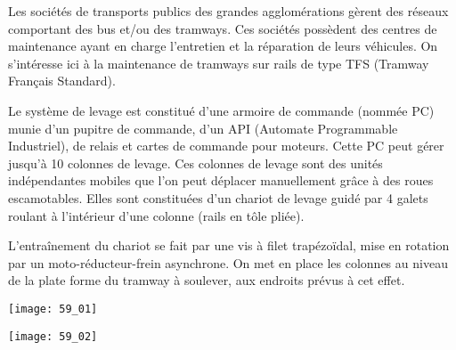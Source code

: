 \normaltrue \difficilefalse \tdifficilefalse
\correctionfalse

\setcounter{question}{0}

\ifcorrection
\else
{}
\fi

\ifprof
\else

Les sociétés de transports publics des grandes agglomérations gèrent des réseaux comportant des
bus et/ou des tramways. Ces sociétés possèdent des centres de maintenance ayant en charge
l’entretien et la réparation de leurs véhicules. %
On s'intéresse ici à la maintenance de tramways sur rails de type
TFS (Tramway Français Standard).


Le système de levage est constitué d’une armoire de commande (nommée PC) munie d’un pupitre
de commande, d’un API (Automate Programmable Industriel), de relais et cartes de commande
pour moteurs. Cette PC peut gérer jusqu’à 10 colonnes de levage. Ces colonnes de levage sont des unités indépendantes mobiles que l’on peut déplacer manuellement
grâce à des roues escamotables. Elles sont constituées d’un chariot de levage guidé par 4 galets roulant à l’intérieur d’une colonne (rails
en tôle pliée). 


L’entraînement du chariot se fait par une vis à filet trapézoïdal, mise en rotation par un moto-réducteur-frein asynchrone. On met en place les colonnes au
niveau de la plate forme du tramway à soulever, aux endroits prévus à cet effet.


\begin{marginfigure}
\centering
\texttt{[image: 59\_01]}
\end{marginfigure}

\begin{marginfigure}
\centering
\texttt{[image: 59\_02]}
\end{marginfigure}


